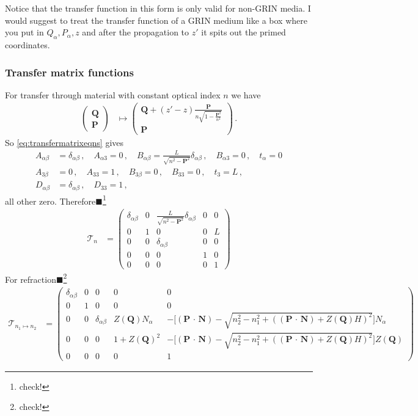 \documentclass[12pt,a4paper,twoside,openright,BCOR10mm,headsepline,titlepage,abstracton,chapterprefix,final]{scrreprt}
\newcommand\Vector[1]{{\mathbf{#1}}}
\newcommand{\scpm}[2]{(#1\,\cdot\,#2)}
\newcommand{\remark}[1]{{\color{red}$\blacksquare$}\footnote{{\color{red}#1}}}
\begin{document}
Notice that the transfer function in this form is only valid for non-GRIN media. I would suggest to treat the transfer function of a GRIN medium
like a box where you put in $Q_\alpha, P_\alpha, z$ and after the propagation to $z'$ it spits out the primed coordinates.
\subsubsection{Transfer matrix functions}
For transfer through material with constant optical index $n$ we have
\begin{align}
 \begin{pmatrix}
  \Vector{Q} \\
  \Vector{P}
 \end{pmatrix} &\mapsto
 \begin{pmatrix}
  \Vector{Q} + (z' -z) \frac{\Vector{P}}{n \sqrt{1 - \frac{\Vector{P}^2}{n^2}}} \\
  \Vector{P}
 \end{pmatrix}\,.
\end{align}
So \eqref{eq:transfermatrixeqns} gives
\begin{align}
 A_{\alpha\beta} &= \delta_{\alpha\beta}\,,\quad A_{\alpha 3} = 0\,,\quad B_{\alpha\beta} = \frac{L}{\sqrt{n^2 - \Vector{P}^2}} \delta_{\alpha\beta}\,,\quad B_{\alpha3} = 0\,,\quad t_\alpha = 0 \\
 A_{3\beta} &= 0\,,\quad A_{33} = 1\,,\quad B_{3\beta} = 0\,,\quad B_{33} = 0\,,\quad t_3 = L\,,\\
 D_{\alpha\beta} &= \delta_{\alpha\beta}\,,\quad D_{33} = 1\,,
\end{align}
all other zero. Therefore\remark{check!}
\begin{align}
 \mathcal{T}_n &=
 \begin{pmatrix}
  \delta_{\alpha\beta} & 0 &  \frac{L}{\sqrt{n^2 - \Vector{P}^2}} \delta_{\alpha\beta} & 0 & 0\\
   0                   & 1 & 0 & 0 & L\\
   0                   & 0 & \delta_{\alpha\beta} & 0 & 0\\
   0                   & 0 & 0 & 1 & 0 \\
   0 & 0 & 0 & 0 & 1
 \end{pmatrix}
\end{align}
For refraction\remark{check!}
\begin{align}
 \mathcal{T}_{n_1\mapsto n_2} &=
 \begin{pmatrix}
  \delta_{\alpha\beta} & 0 &  0 & 0 & 0\\
   0                   & 1 & 0 & 0 & 0\\
   0                   & 0 & \delta_{\alpha\beta} & Z(\Vector{Q}) N_\alpha & -\biggl[\scpm{\Vector{P}}{\Vector{N}} - \sqrt{n_2^2 - n_1^2 + (\scpm{\Vector{P}}{\Vector{N}} + Z(\Vector{Q}) H)^2}\biggr] N_\alpha \\
   0                   & 0 & 0 & 1 + Z(\Vector{Q})^2 & -\biggl[\scpm{\Vector{P}}{\Vector{N}} - \sqrt{n_2^2 - n_1^2 + (\scpm{\Vector{P}}{\Vector{N}} + Z(\Vector{Q}) H)^2}\biggr] Z(\Vector{Q}) \\
   0 & 0 & 0 & 0 & 1
 \end{pmatrix}
\end{align}
\end{document}
